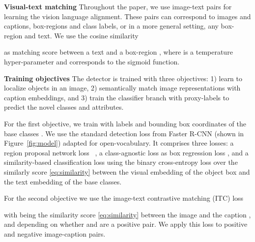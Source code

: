 \documentclass[10pt,twocolumn,letterpaper]{article}
\renewcommand\paragraph[1]{\vspace{0.12cm}\noindent\textbf{#1}}
\begin{document}
\paragraph{Visual-text matching} Throughout the paper, we use image-text pairs for learning the vision language alignment. These pairs can correspond to images and captions, box-regions and class labels, or in a more general setting, any box-region and text. We use the cosine similarity

as matching score between a text  and a box-region , where  is a temperature hyper-parameter and  corresponds to the sigmoid function. 

\paragraph{Training objectives} The detector  is trained with three objectives: 1) learn to localize objects in an image, 2) semantically match image representations with caption embeddings, and 3) train the classifier branch with proxy-labels to predict the novel classes and attributes. 


For the first objective, we train  with labels and bounding box coordinates of the base classes . 
We use the standard detection loss  from Faster R-CNN (shown in Figure~\ref{fig:model}) adapted for open-vocabulary. 
It comprises three losses: a region proposal network loss ~\cite{faster_rcnn}, a class-agnostic  loss as box regression loss , and a similarity-based classification loss  using the binary cross-entropy loss over the similarly score \eqref{eq:similarity} between the visual embedding of the object box and the text embedding of the base classes. 


For the second objective we use the image-text contrastive matching (ITC) loss

with  being the similarity score \eqref{eq:similarity} between the image  and the caption , and  depending on whether  and  are a positive pair.
We apply this loss to positive and negative image-caption pairs. 
\end{document}
